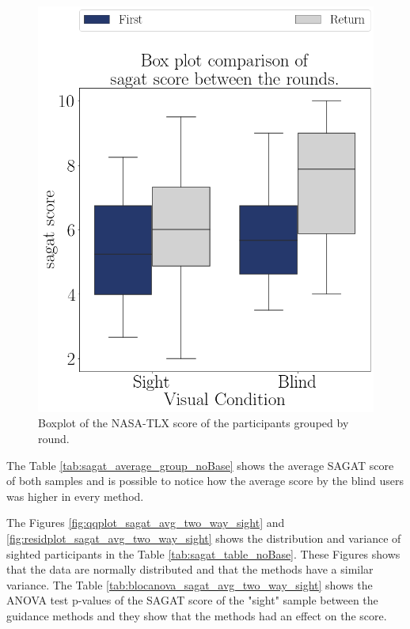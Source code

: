 \begin{figure}[!htb]
\begin{minipage}{0.45\textwidth}
        \includegraphics[width = 0.8\linewidth]{Resultados/Sagat/Figuras/png/boxplot_sagat_4_rounds.png}
        \caption{Boxplot of the NASA-TLX score of the participants grouped by round.}
        \label{fig:boxplot_sagat_4_rounds}
    \end{minipage}
\end{figure}

The Table \ref{tab:sagat_average_group_noBase} shows the average SAGAT score of both samples and is possible to notice how the average score by the blind users was higher in every method.



The Figures \ref{fig:qqplot_sagat_avg_two_way_sight} and \ref{fig:residplot_sagat_avg_two_way_sight} shows the distribution and variance of sighted participants in the Table \ref{tab:sagat_table_noBase}. These Figures shows that the data are normally distributed and that the methods have a similar variance.
The Table \ref{tab:blocanova_sagat_avg_two_way_sight} shows the ANOVA test p-values of the SAGAT score of the "sight" sample between the guidance methods and they show that the methods had an effect on the score.



